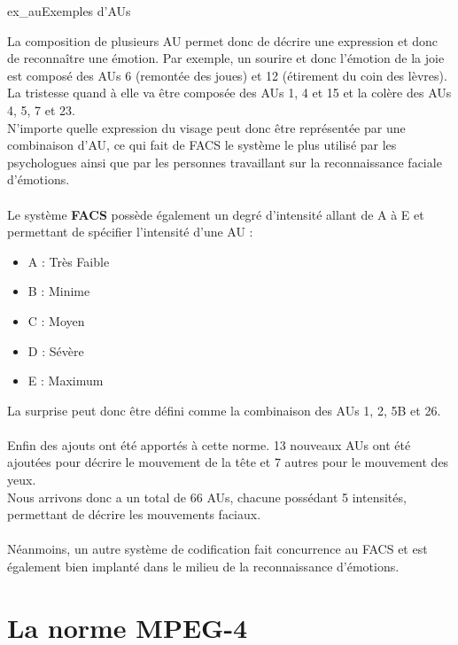 \documentclass[overfullbox, poster]{polytech/polytech}
\begin{document}
\begin{Figure}{ex_au}{Exemples d'AUs}
\end{Figure}

La composition de plusieurs AU permet donc de décrire une expression et donc de reconnaître une émotion. Par exemple, un sourire et donc l'émotion de la joie est composé des AUs 6 (remontée des joues) et 12 (étirement du coin des lèvres).\\
La tristesse quand à elle va être composée des AUs 1, 4 et 15 et la colère des AUs 4, 5, 7 et 23.\\
N'importe quelle expression du visage peut donc être représentée par une combinaison d'AU, ce qui fait de FACS le système le plus utilisé par les psychologues ainsi que par les personnes travaillant sur la reconnaissance faciale d'émotions.\\
\\
Le système \textbf{FACS} possède également un degré d'intensité allant de A à E et permettant de spécifier l'intensité d'une AU :
\begin{itemize}
	\item A : Très Faible
	\item B : Minime
	\item C : Moyen
	\item D : Sévère
	\item E : Maximum
\end{itemize}
La surprise peut donc être défini comme la combinaison des AUs 1, 2, 5B et 26.\\
\\
Enfin des ajouts ont été apportés à cette norme. 13 nouveaux AUs ont été ajoutées pour décrire le mouvement de la tête et 7 autres pour le mouvement des yeux.\\
Nous arrivons donc a un total de 66 AUs, chacune possédant 5 intensités, permettant de décrire les mouvements faciaux.\\
\\
Néanmoins, un autre système de codification fait concurrence au FACS et est également bien implanté dans le milieu de la reconnaissance d'émotions.

\newpage
\section{La norme MPEG-4}
\label{sec:fapu}
\end{document}
